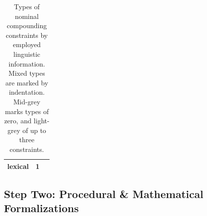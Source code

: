 \documentclass[10pt, a4paper]{article}
\begin{document}
\begin{table}[!ht]
\begin{center}
\begin{tabularx}{\columnwidth}{|l|>{\centering\arraybackslash}X|>{\centering\arraybackslash}X|}
      \hline
      lexical                       & \cellcolor{lightgrey} 1       & 4 \\
      
      \hline

\end{tabularx}
\end{center}

\vspace{-0.5em}

\caption{Types of nominal compounding constraints by employed linguistic information. Mixed types are marked by indentation. Mid-grey marks types of zero, and light-grey of up to three constraints.}
\label{tab_constr_prop}

\vspace{-1.1em}
 
\end{table}



\subsection{Step Two: Procedural \& Mathematical Formalizations}
\label{sec:formal}

\end{document}
